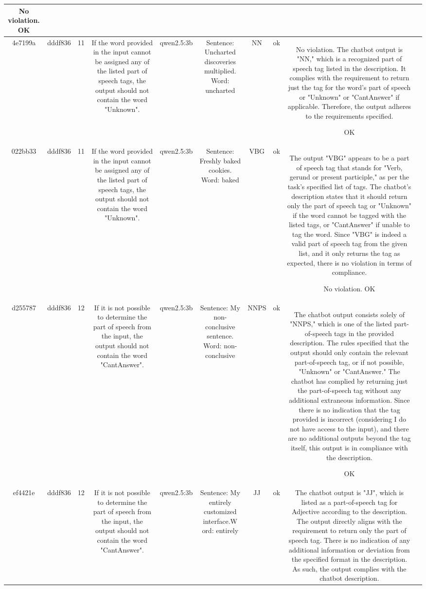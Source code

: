 \begin{table}[h!]
\begin{tabular}{|c|c|c|c|c|c|c|c|c|c|}
No violation.
OK & \\
\hline
4e7199a & dddf836 & 11 & If the word provided in the input cannot be assigned any of the listed part of speech tags, the output should not contain the word "Unknown". & qwen2.5:3b & Sentence: Uncharted discoveries multiplied. Word: uncharted & NN & ok & No violation. The chatbot output is "NN," which is a recognized part of speech tag listed in the description. It complies with the requirement to return just the tag for the word's part of speech or "Unknown" or "CantAnswer" if applicable. Therefore, the output adheres to the requirements specified.

OK & \\
\hline
022bb33 & dddf836 & 11 & If the word provided in the input cannot be assigned any of the listed part of speech tags, the output should not contain the word "Unknown". & qwen2.5:3b & Sentence: Freshly baked cookies. Word: baked & VBG & ok & The output "VBG" appears to be a part of speech tag that stands for "Verb, gerund or present participle," as per the task's specified list of tags. The chatbot's description states that it should return only the part of speech tag or "Unknown" if the word cannot be tagged with the listed tags, or "CantAnswer" if unable to tag the word. Since "VBG" is indeed a valid part of speech tag from the given list, and it only returns the tag as expected, there is no violation in terms of compliance.

No violation.
OK & \\
\hline
d255787 & dddf836 & 12 & If it is not possible to determine the part of speech from the input, the output should not contain the word "CantAnswer". & qwen2.5:3b & Sentence: My non-conclusive sentence. Word: non-conclusive & NNPS & ok & The chatbot output consists solely of "NNPS," which is one of the listed part-of-speech tags in the provided description. The rules specified that the output should only contain the relevant part-of-speech tag, or if not possible, "Unknown" or "CantAnswer." The chatbot has complied by returning just the part-of-speech tag without any additional extraneous information. Since there is no indication that the tag provided is incorrect (considering I do not have access to the input), and there are no additional outputs beyond the tag itself, this output is in compliance with the description.

OK & \\
\hline
ef4421e & dddf836 & 12 & If it is not possible to determine the part of speech from the input, the output should not contain the word "CantAnswer". & qwen2.5:3b & Sentence: My entirely customized interface.W ord: entirely & JJ & ok & The chatbot output is "JJ", which is listed as a part-of-speech tag for Adjective according to the description. The output directly aligns with the requirement to return only the part of speech tag. There is no indication of any additional information or deviation from the specified format in the description. As such, the output complies with the chatbot description.


\end{tabular}
\end{table}
